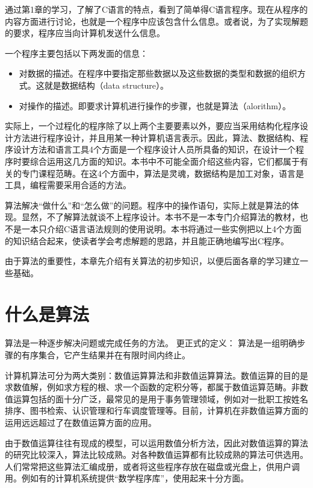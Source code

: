 \begin{lslisting}
\begin{enumerate}
通过第1章的学习，了解了C语言的特点，看到了简单得C语言程序。现在从程序的内容方面进行讨论，也就是一个程序中应该包含什么信息。或者说，为了实现解题的要求，程序应当向计算机发送什么信息。

一个程序主要包括以下两发面的信息：
\begin{itemize}
	\item 对数据的描述。在程序中要指定那些数据以及这些数据的类型和数据的组织方式。这就是数据结构（data structure）。
	\item 对操作的描述。即要求计算机进行操作的步骤，也就是算法（alorithm）。
\end{itemize}

实际上，一个过程化的程序除了以上两个主要要素以外，要应当采用结构化程序设计方法进行程序设计，并且用某一种计算机语言表示。因此，算法、数据结构、程序设计方法和语言工具4个方面是一个程序设计人员所具备的知识，在设计一个程序时要综合运用这几方面的知识。本书中不可能全面介绍这些内容，它们都属于有关的专门课程范畴。在这4个方面中，算法是灵魂，数据结构是加工对象，语言是工具，编程需要采用合适的方法。

算法解决“做什么”和“怎么做”的问题。程序中的操作语句，实际上就是算法的体现。显然，不了解算法就谈不上程序设计。本书不是一本专门介绍算法的教材，也不是一本只介绍C语言语法规则的使用说明。本书将通过一些实例把以上4个方面的知识结合起来，使读者学会考虑解题的思路，并且能正确地编写出C程序。

由于算法的重要性，本章先介绍有关算法的初步知识，以便后面各章的学习建立一些基础。

\section{什么是算法}

算法是一种逐步解决问题或完成任务的方法。
更正式的定义：
算法是一组明确步骤的有序集合，它产生结果并在有限时间内终止。

计算机算法可分为两大类别：数值运算算法和非数值运算算法。数值运算的目的是求数值解，例如求方程的根、求一个函数的定积分等，都属于数值运算范畴。非数值运算包括的面十分广泛，最常见的是用于事务管理领域，例如对一批职工按姓名排序、图书检索、认识管理和行车调度管理等。目前，计算机在非数值运算方面的运用远远超过了在数值运算方面的应用。

由于数值运算往往有现成的模型，可以运用数值分析方法，因此对数值运算的算法的研究比较深入，算法比较成熟。对各种数值运算都有比较成熟的算法可供选用。人们常常把这些算法汇编成册，或者将这些程序存放在磁盘或光盘上，供用户调用。例如有的计算机系统提供“数学程序库”，使用起来十分方面。


\end{enumerate}
\end{lslisting}
